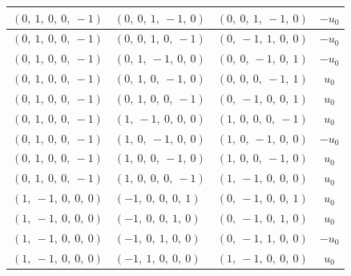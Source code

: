 \documentclass[11pt]{article}
\theoremstyle{definition}
\begin{document}
\begin{longtable}{|l|l|l|c|}
    \hline
    $\left( 0, \  1, \  0, \  0, \  -1\right)$ & $\left( 0, \  0, \  1, \  -1, \  0\right)$ & $\left( 0, \  0, \  1, \  -1, \  0\right)$ & $- u_{0}$ \\
    \hline
    $\left( 0, \  1, \  0, \  0, \  -1\right)$ & $\left( 0, \  0, \  1, \  0, \  -1\right)$ & $\left( 0, \  -1, \  1, \  0, \  0\right)$ & $- u_{0}$ \\
    \hline
    $\left( 0, \  1, \  0, \  0, \  -1\right)$ & $\left( 0, \  1, \  -1, \  0, \  0\right)$ & $\left( 0, \  0, \  -1, \  0, \  1\right)$ & $- u_{0}$ \\
    \hline
    $\left( 0, \  1, \  0, \  0, \  -1\right)$ & $\left( 0, \  1, \  0, \  -1, \  0\right)$ & $\left( 0, \  0, \  0, \  -1, \  1\right)$ & $u_{0}$ \\
    \hline
    $\left( 0, \  1, \  0, \  0, \  -1\right)$ & $\left( 0, \  1, \  0, \  0, \  -1\right)$ & $\left( 0, \  -1, \  0, \  0, \  1\right)$ & $u_{0}$ \\
    \hline
    $\left( 0, \  1, \  0, \  0, \  -1\right)$ & $\left( 1, \  -1, \  0, \  0, \  0\right)$ & $\left( 1, \  0, \  0, \  0, \  -1\right)$ & $u_{0}$ \\
    \hline
    $\left( 0, \  1, \  0, \  0, \  -1\right)$ & $\left( 1, \  0, \  -1, \  0, \  0\right)$ & $\left( 1, \  0, \  -1, \  0, \  0\right)$ & $- u_{0}$ \\
    \hline
    $\left( 0, \  1, \  0, \  0, \  -1\right)$ & $\left( 1, \  0, \  0, \  -1, \  0\right)$ & $\left( 1, \  0, \  0, \  -1, \  0\right)$ & $u_{0}$ \\
    \hline
    $\left( 0, \  1, \  0, \  0, \  -1\right)$ & $\left( 1, \  0, \  0, \  0, \  -1\right)$ & $\left( 1, \  -1, \  0, \  0, \  0\right)$ & $u_{0}$ \\
    \hline
    $\left( 1, \  -1, \  0, \  0, \  0\right)$ & $\left( -1, \  0, \  0, \  0, \  1\right)$ & $\left( 0, \  -1, \  0, \  0, \  1\right)$ & $u_{0}$ \\
    \hline
    $\left( 1, \  -1, \  0, \  0, \  0\right)$ & $\left( -1, \  0, \  0, \  1, \  0\right)$ & $\left( 0, \  -1, \  0, \  1, \  0\right)$ & $u_{0}$ \\
    \hline
    $\left( 1, \  -1, \  0, \  0, \  0\right)$ & $\left( -1, \  0, \  1, \  0, \  0\right)$ & $\left( 0, \  -1, \  1, \  0, \  0\right)$ & $- u_{0}$ \\
    \hline
    $\left( 1, \  -1, \  0, \  0, \  0\right)$ & $\left( -1, \  1, \  0, \  0, \  0\right)$ & $\left( 1, \  -1, \  0, \  0, \  0\right)$ & $u_{0}$ \\

\end{longtable}
\end{document}
